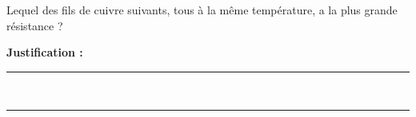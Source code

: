Lequel des fils de cuivre suivants, tous à la même température, a la plus grande résistance ?

\choices

\noindent\textbf{Justification :} \hrulefill \\[2.5ex]
\rule{\linewidth}{0.4pt} \\[2.5ex]
\rule{\linewidth}{0.4pt}
\vfill
